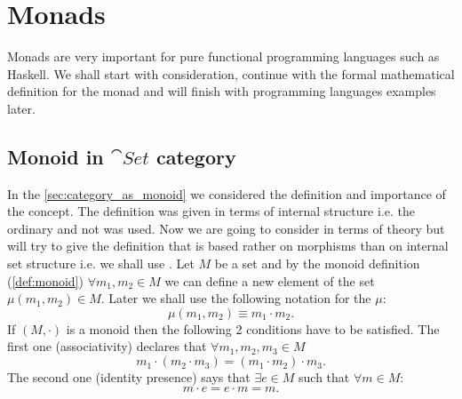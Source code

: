 \chapter{Monads}

Monads are very important for pure functional programming languages
such as Haskell. We shall start with 
consideration, continue with the formal mathematical definition for
the monad and
will finish with programming languages examples later.

\section{Monoid in $\cat{Set}$ category}
In the \cref{sec:category_as_monoid} we considered the definition and
importance of the  concept. The definition was given
in terms of internal structure i.e. the ordinary and not
 was used.
Now we are going to consider  in terms of
 theory but 
will try to give the definition that is based rather on morphisms than
on internal set structure i.e. we shall use
. Let $M$ be a set and by the
monoid 
definition (\cref{def:monoid})
$\forall m_1, m_2 \in M$ we can define a new element of the set
$\mu(m_1, m_2) \in M$. Later we shall use the following notation for
the $\mu$:
\[
\mu(m_1, m_2) \equiv m_1 \cdot m_2.
\]
If $(M, \cdot)$ is a monoid then the following 2 conditions have to
be satisfied. The first one (associativity) declares that $\forall
m_1, m_2, m_3 \in M$ 
\begin{equation}
\label{eq:monoid1}
m_1 \cdot ( m_2 \cdot m_3) = ( m_1 \cdot
m_2 ) \cdot m_3.
\end{equation}
The second one (identity presence) says that
\(
\exists e \in M
\) such that $\forall m \in M$:
\begin{equation}
\label{eq:monoid2}
m \cdot e = e \cdot m = m.
\end{equation}

